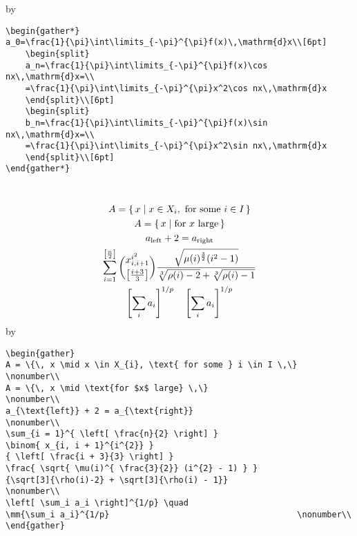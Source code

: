 %
by
%
\begin{verbatim}
\begin{gather*}
a_0=\frac{1}{\pi}\int\limits_{-\pi}^{\pi}f(x)\,\mathrm{d}x\\[6pt]
	\begin{split}
	a_n=\frac{1}{\pi}\int\limits_{-\pi}^{\pi}f(x)\cos nx\,\mathrm{d}x=\\
	=\frac{1}{\pi}\int\limits_{-\pi}^{\pi}x^2\cos nx\,\mathrm{d}x
	\end{split}\\[6pt]
	\begin{split}
	b_n=\frac{1}{\pi}\int\limits_{-\pi}^{\pi}f(x)\sin nx\,\mathrm{d}x=\\
	=\frac{1}{\pi}\int\limits_{-\pi}^{\pi}x^2\sin nx\,\mathrm{d}x
	\end{split}\\[6pt]
\end{gather*}
\end{verbatim}
%
%
\par \raggedright{}\\
%
%
\begin{gather}
	A = \{\, x \mid x \in X_{i}, \text{ for some } i \in I \,\}          \nonumber\\
	A = \{\, x \mid \text{for $x$ large} \,\}                            \nonumber\\
	a_{\text{left}} + 2 = a_{\text{right}}                               \nonumber\\
	\sum_{i = 1}^{ \left[ \frac{n}{2} \right] }
	\binom{ x_{i, i + 1}^{i^{2}} }
	{ \left[ \frac{i + 3}{3} \right] }
	\frac{ \sqrt{ \mu(i)^{ \frac{3}{2}} (i^{2} - 1) } }
	{\sqrt[3]{\rho(i)-2} + \sqrt[3]{\rho(i) - 1}}                       \nonumber\\   
	\left[ \sum_i a_i \right]^{1/p} \quad
	\left[\sum_i a_i\right]^{1/p}                                    \nonumber\\         
\end{gather}
%
by
%
\begin{verbatim}
\begin{gather}
A = \{\, x \mid x \in X_{i}, \text{ for some } i \in I \,\}          \nonumber\\
A = \{\, x \mid \text{for $x$ large} \,\}                            \nonumber\\
a_{\text{left}} + 2 = a_{\text{right}}                               \nonumber\\
\sum_{i = 1}^{ \left[ \frac{n}{2} \right] }
\binom{ x_{i, i + 1}^{i^{2}} }
{ \left[ \frac{i + 3}{3} \right] }
\frac{ \sqrt{ \mu(i)^{ \frac{3}{2}} (i^{2} - 1) } }
{\sqrt[3]{\rho(i)-2} + \sqrt[3]{\rho(i) - 1}}                       \nonumber\\   
\left[ \sum_i a_i \right]^{1/p} \quad
\mm{\sum_i a_i}^{1/p}                                      \nonumber\\         
\end{gather}
\end{verbatim}
%
%
\begin{center}\end{center}

